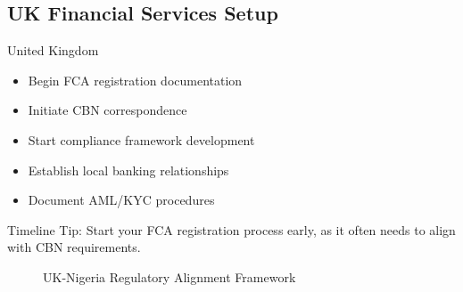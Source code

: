 \subsection{UK Financial Services Setup}\label{subsec:uk-setup}
\begin{regionalbox}{United Kingdom}
\begin{itemize}
    \item Begin FCA registration documentation
    \item Initiate CBN correspondence
    \item Start compliance framework development
    \item Establish local banking relationships
    \item Document AML/KYC procedures
\end{itemize}

Timeline Tip: Start your FCA registration process early, as it often needs to align with CBN requirements.

\begin{figure}[htbp]
    \centering
    \caption{UK-Nigeria Regulatory Alignment Framework}
    \label{fig:uk-regulatory-framework}
\end{figure}
\end{regionalbox}
